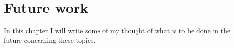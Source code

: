 
\chapter{Future work}
In this chapter I will write some of my thought of what is to be done in the future concerning these topics. 